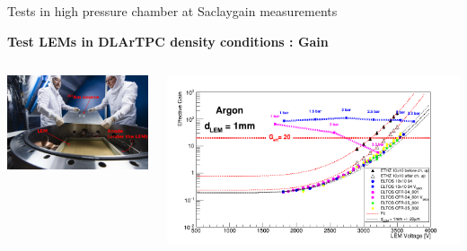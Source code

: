 \documentclass[10pt]{beamer}
\begin{document}
    \begin{frame}{Tests in high pressure chamber at Saclay}{gain measurements}
    	\begin{scriptsize}
    		\begin{center}\textbf{Test LEMs in DLArTPC density conditions : Gain}\end{center}
    		\begin{columns}
    			\begin{column}{0.42\textwidth}
    				\centering \includegraphics[width=\textwidth]{figures/666/gamelle_source.png}
    			\end{column}\hfill
    			\begin{column}{0.68\textwidth}
    				\centering \includegraphics[width=\textwidth]{figures/666/gain.png}
    			\end{column}
    		\end{columns}\vfill
    		\begin{columns}
    			\begin{column}{0.38\textwidth}

\end{column}
\end{columns}
\end{scriptsize}
\end{frame}
\end{document}
